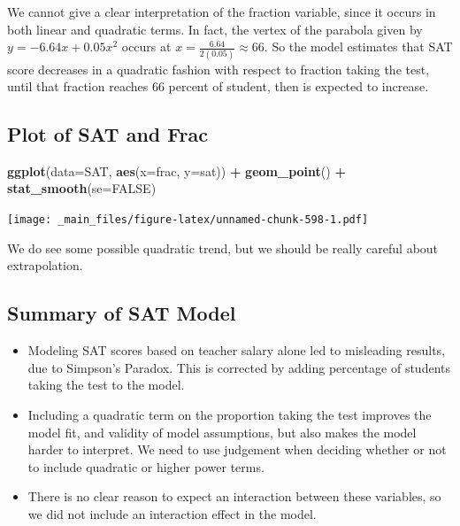 \documentclass[]{book}
\newenvironment{Shaded}{\begin{snugshade}}{\end{snugshade}}
\newcommand{\KeywordTok}[1]{\textcolor[rgb]{0.13,0.29,0.53}{\textbf{#1}}}
\newcommand{\DataTypeTok}[1]{\textcolor[rgb]{0.13,0.29,0.53}{#1}}
\newcommand{\StringTok}[1]{\textcolor[rgb]{0.31,0.60,0.02}{#1}}
\newcommand{\OtherTok}[1]{\textcolor[rgb]{0.56,0.35,0.01}{#1}}
\newcommand{\OperatorTok}[1]{\textcolor[rgb]{0.81,0.36,0.00}{\textbf{#1}}}
\newcommand{\NormalTok}[1]{#1}
\begin{document}
We cannot give a clear interpretation of the fraction variable, since it
occurs in both linear and quadratic terms. In fact, the vertex of the
parabola given by \(y=-6.64x + 0.05x^2\) occurs at
\(x=\frac{6.64}{2(0.05)}\approx 66\). So the model estimates that SAT
score decreases in a quadratic fashion with respect to fraction taking
the test, until that fraction reaches 66 percent of student, then is
expected to increase.

\subsection{Plot of SAT and Frac}\label{plot-of-sat-and-frac}

\begin{Shaded}
\begin{Highlighting}[]
\KeywordTok{ggplot}\NormalTok{(}\DataTypeTok{data=}\NormalTok{SAT, }\KeywordTok{aes}\NormalTok{(}\DataTypeTok{x=}\NormalTok{frac, }\DataTypeTok{y=}\NormalTok{sat)) }\OperatorTok{+}\StringTok{ }\KeywordTok{geom_point}\NormalTok{() }\OperatorTok{+}\StringTok{ }\KeywordTok{stat_smooth}\NormalTok{(}\DataTypeTok{se=}\OtherTok{FALSE}\NormalTok{)}
\end{Highlighting}
\end{Shaded}

\texttt{[image: \_main\_files/figure-latex/unnamed-chunk-598-1.pdf]}

We do see some possible quadratic trend, but we should be really careful
about extrapolation.

\subsection{Summary of SAT Model}\label{summary-of-sat-model}

\begin{itemize}
\item
  Modeling SAT scores based on teacher salary alone led to misleading
  results, due to Simpson's Paradox. This is corrected by adding
  percentage of students taking the test to the model.
\item
  Including a quadratic term on the proportion taking the test improves
  the model fit, and validity of model assumptions, but also makes the
  model harder to interpret. We need to use judgement when deciding
  whether or not to include quadratic or higher power terms.
\item
  There is no clear reason to expect an interaction between these
  variables, so we did not include an interaction effect in the model.
\end{itemize}
\end{document}
